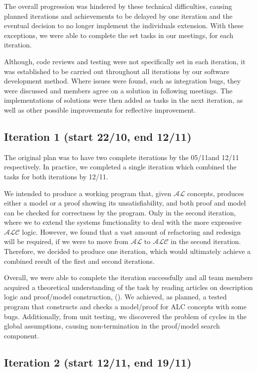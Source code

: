The overall progression was hindered by these technical difficulties, causing planned iterations and achievements to be delayed by one iteration and the eventual decision to no longer implement the individuals extension. With these exceptions, we were able to complete the set tasks in our meetings, for each iteration.

Although, code reviews and testing were not specifically set in each iteration, it was established to be carried out throughout all iterations by our software development method. Where issues were found, such as integration bugs, they were discussed and members agree on a solution in following meetings. The implementations of solutions were then added as tasks in the next iteration, as well as other possible improvements for reflective improvement.

\subsection*{Iteration 1 (start 22/10, end 12/11)}

The original plan was to have two complete iterations by the 05/11and 12/11 respectively. In practice, we completed a single iteration which combined the tasks for both iterations by 12/11.

We intended to produce a working program that, given $\mathcal{AL}$ concepts, produces either a model or a proof showing its unsatisfiability, and both proof and model can be checked for correctness by the program. Only in the second iteration, where we to extend the systems functionality to deal with the more expressive  $\mathcal{ALC}$ logic. However, we found that a vast amount of refactoring and redesign will be required, if we were to move from  $\mathcal{AL}$ to  $\mathcal{ALC}$ in the second iteration. Therefore, we decided to produce one iteration, which would ultimately achieve a combined result of the first and second iterations.

Overall, we were able to complete the iteration successfully and all team members acquired a theoretical understanding of the task by reading articles on description logic and proof/model construction, (\cite{baadernutt02, gore99, Gore:2010:OTA, gore07}). We achieved, as planned, a tested program that constructs and checks a model/proof for ALC concepts with some bugs. Additionally, from unit testing, we discovered the problem of cycles in the global assumptions, causing non-termination in the proof/model search component.

\subsection*{Iteration 2 (start 12/11, end 19/11)}

